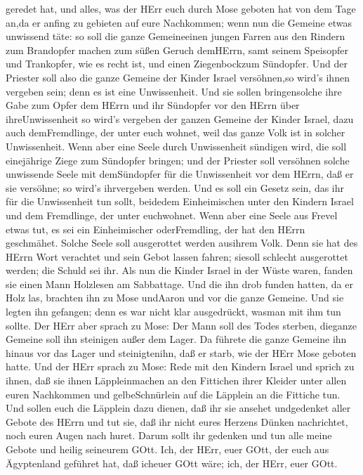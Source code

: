 geredet hat,  und alles, was der HErr euch durch Mose
geboten hat von dem Tage an,da er anfing zu gebieten auf eure
Nachkommen;  wenn nun die Gemeine etwas unwissend täte: so
soll die ganze Gemeineeinen jungen Farren aus den Rindern zum Brandopfer
machen zum süßen Geruch demHErrn, samt seinem Speisopfer und Trankopfer,
wie es recht ist, und einen Ziegenbockzum Sündopfer.  Und
der Priester soll also die ganze Gemeine der Kinder Israel versöhnen,so
wird's ihnen vergeben sein; denn es ist eine Unwissenheit. Und sie
sollen bringensolche ihre Gabe zum Opfer dem HErrn und ihr Sündopfer vor
den HErrn über ihreUnwissenheit  so wird's vergeben der
ganzen Gemeine der Kinder Israel, dazu auch demFremdlinge, der unter
euch wohnet, weil das ganze Volk ist in solcher Unwissenheit.
 Wenn aber eine Seele durch Unwissenheit sündigen wird, die
soll einejährige Ziege zum Sündopfer bringen;  und der
Priester soll versöhnen solche unwissende Seele mit demSündopfer für die
Unwissenheit vor dem HErrn, daß er sie versöhne; so wird's ihrvergeben
werden.  Und es soll ein Gesetz sein, das ihr für die
Unwissenheit tun sollt, beidedem Einheimischen unter den Kindern Israel
und dem Fremdlinge, der unter euchwohnet.  Wenn aber eine
Seele aus Frevel etwas tut, es sei ein Einheimischer oderFremdling, der
hat den HErrn geschmähet. Solche Seele soll ausgerottet werden ausihrem
Volk.  Denn sie hat des HErrn Wort verachtet und sein Gebot
lassen fahren; siesoll schlecht ausgerottet werden; die Schuld sei ihr.
 Als nun die Kinder Israel in der Wüste waren, fanden sie
einen Mann Holzlesen am Sabbattage.  Und die ihn drob
funden hatten, da er Holz las, brachten ihn zu Mose undAaron und vor die
ganze Gemeine.  Und sie legten ihn gefangen; denn es war
nicht klar ausgedrückt, wasman mit ihm tun sollte.  Der
HErr aber sprach zu Mose: Der Mann soll des Todes sterben, dieganze
Gemeine soll ihn steinigen außer dem Lager.  Da führete die
ganze Gemeine ihn hinaus vor das Lager und steinigtenihn, daß er starb,
wie der HErr Mose geboten hatte.  Und der HErr sprach zu
Mose:  Rede mit den Kindern Israel und sprich zu ihnen, daß
sie ihnen Läppleinmachen an den Fittichen ihrer Kleider unter allen
euren Nachkommen und gelbeSchnürlein auf die Läpplein an die Fittiche
tun.  Und sollen euch die Läpplein dazu dienen, daß ihr sie
ansehet undgedenket aller Gebote des HErrn und tut sie, daß ihr nicht
eures Herzens Dünken nachrichtet, noch euren Augen nach huret.
 Darum sollt ihr gedenken und tun alle meine Gebote und
heilig seineurem GOtt.  Ich, der HErr, euer GOtt, der euch
aus Ägyptenland geführet hat, daß icheuer GOtt wäre; ich, der HErr, euer
GOtt.

